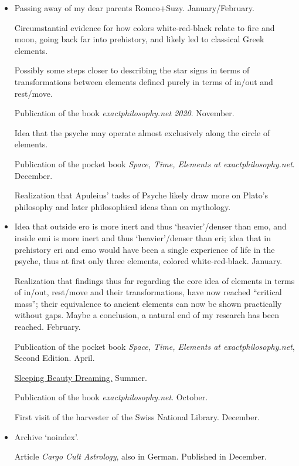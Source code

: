 \begin{itemize}
\item[2020]
Passing away of my dear parents Romeo+Suzy.
%
January/February.

Circumstantial evidence for how colors
white-red-black relate to fire and moon,
going back far into prehistory,
and likely led to classical Greek elements.

Possibly some steps closer
to describing the star signs in terms of transformations
between elements defined purely in terms of in/out and rest/move.

Publication of the book \textsl{exactphilosophy.net 2020}.
%
November.

Idea that the psyche may operate almost exclusively along the circle of elements.

Publication of the pocket book \textsl{Space, Time, Elements at exactphilosophy.net}.
December.

Realization that Apuleius’ tasks of Psyche likely draw more on Plato’s philosophy
and later philosophical ideas than on mythology.

\item[2021]
Idea that outside ero is more inert and thus ‘heavier’$\!$/denser than emo,
and inside emi is more inert and thus ‘heavier’$\!$/denser than eri;
idea that in prehistory eri and emo
would have been a single experience of life in the psyche,
thus at first only three elements,
colored white-red-black.
%
January.

Realization that findings thus far
regarding the core idea
of elements in terms of in/out, rest/move and their transformations,
have now reached “critical mass”;
their equivalence to ancient elements can now be shown
practically without gaps.
Maybe a conclusion, a natural end of my research has been reached.
%
February.

Publication of the pocket book \textsl{Space, $\!$Time, Elements at exactphilosophy.net},
Second Edition.
%
April.

\href{https://www.exactphilosophy.net/sleeping-beauty-dreaming.pdf}{\color{xphi}Sleeping Beauty Dreaming.}
{\color{xphi}Summer.}

Publication of the book \textsl{exactphilosophy.net}.
%
October.

First visit of the harvester of the Swiss National Library.
%
December.

\item[2022]
Archive ‘noindex’.

Article \textsl{Cargo Cult Astrology}, also in German.
%
Published in December.


\end{itemize}
